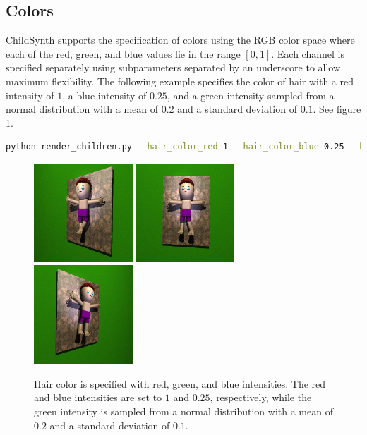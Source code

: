 \documentclass{article}
\begin{document}
\subsection{Colors}
ChildSynth supports the specification of colors using the RGB color space where each of the red, green, and blue values lie in the range $[0,1]$. Each channel is specified separately using subparameters separated by an underscore to allow maximum flexibility. The following example specifies the color of hair with a red intensity of $1$, a blue intensity of $0.25$, and a green intensity sampled from a normal distribution with a mean of $0.2$ and a standard deviation of $0.1$. See figure \ref{fig:red_hair}.


\begin{lstlisting}[language=bash]
python render_children.py --hair_color_red 1 --hair_color_blue 0.25 --hair_color_green normal:0.5,0.1\end{lstlisting}

\begin{figure}[htbp]
    \centering
    \includegraphics[height=3.7cm]{plots/child_000000_rgb_060.png}
    \includegraphics[height=3.7cm]{plots/child_000000_rgb_090.png}
    \includegraphics[height=3.7cm]{plots/child_000000_rgb_120.png}
    \caption{Hair color is specified with red, green, and blue intensities. The red and blue intensities are set to $1$ and $0.25$, respectively, while the green intensity is sampled from a normal distribution with a mean of $0.2$ and a standard deviation of $0.1$.}
    \label{fig:red_hair}
\end{figure}
\end{document}
